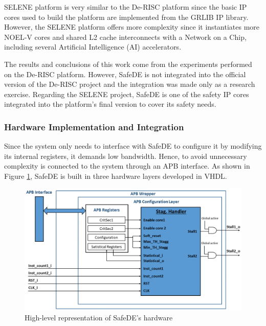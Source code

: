 SELENE platform is very similar to the De-RISC platform since the basic IP cores used to build the platform are implemented from the GRLIB IP library. However, the SELENE platform offers more complexity since it instantiates more NOEL-V cores and shared L2 cache interconnects with a Network on a Chip, including several Artificial Intelligence (AI) accelerators.

The results and conclusions of this work come from the experiments performed on the De-RISC platform. However, SafeDE is not integrated into the official version of the De-RISC project and the integration was made only as a research exercise. Regarding the SELENE project, SafeDE is one of the safety IP cores integrated into the platform's final version to cover its safety needs.

\subsubsection{Hardware Implementation and Integration}

Since the system only needs to interface with SafeDE to configure it by modifying its internal registers, it demands low bandwidth. Hence, to avoid unnecessary complexity is connected to the system through an APB interface. As shown in Figure \ref{fig:SafeDE_hardware}, SafeDE is built in three hardware layers developed in VHDL. 

\begin{figure}[h]
    \centering
    \includegraphics[scale=0.4]{img/SafeDE_hardware.png}
    \caption{High-level representation of SafeDE's hardware}
    \label{fig:SafeDE_hardware}
\end{figure}

